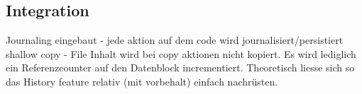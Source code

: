 \subsection{Integration}
Journaling eingebaut - jede aktion auf dem code wird journalisiert/persistiert
shallow copy - File Inhalt wird bei copy aktionen nicht kopiert. Es wird lediglich ein Referenzcounter auf den Datenblock incrementiert. Theoretisch liesse sich so das History feature relativ (mit vorbehalt) einfach nachrüsten. 

